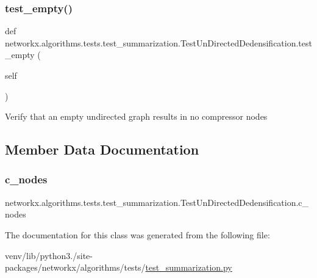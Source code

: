 \subsubsection{\texorpdfstring{test\+\_\+empty()}{test\_empty()}}
{\footnotesize\ttfamily def networkx.\+algorithms.\+tests.\+test\+\_\+summarization.\+Test\+Un\+Directed\+Dedensification.\+test\+\_\+empty (\begin{DoxyParamCaption}\item[{}]{self }\end{DoxyParamCaption})}

\begin{DoxyVerb}Verify that an empty undirected graph results in no compressor nodes
\end{DoxyVerb}
 

\subsection{Member Data Documentation}
\mbox{\label{classnetworkx_1_1algorithms_1_1tests_1_1test__summarization_1_1TestUnDirectedDedensification_a2c4677355f8878661c45b8c6f4a1c3cb}} 
\subsubsection{\texorpdfstring{c\+\_\+nodes}{c\_nodes}}
{\footnotesize\ttfamily networkx.\+algorithms.\+tests.\+test\+\_\+summarization.\+Test\+Un\+Directed\+Dedensification.\+c\+\_\+nodes}



The documentation for this class was generated from the following file\+:\begin{DoxyCompactItemize}
\item 
venv/lib/python3./site-\/packages/networkx/algorithms/tests/\hyperlink{test__summarization_8py}{test\+\_\+summarization.\+py}\end{DoxyCompactItemize}
